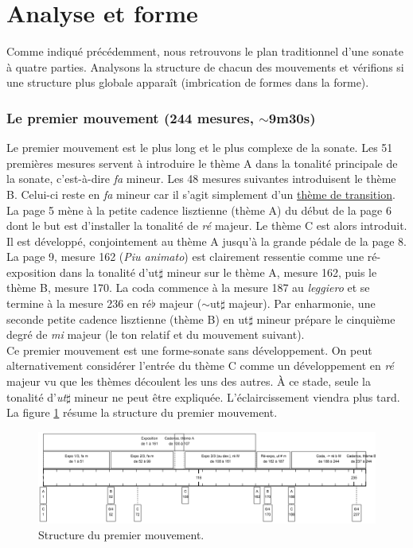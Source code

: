 \section{Analyse et forme}

Comme indiqué précédemment, nous retrouvons le plan traditionnel d'une sonate à quatre parties. Analysons la structure de chacun des mouvements et vérifions si une structure plus globale apparaît (imbrication de formes dans la forme).

\subsubsection*{Le premier mouvement (244 mesures, $\sim$9m30s)}

Le premier mouvement est le plus long et le plus complexe de la sonate. Les 51 premières mesures servent à introduire le thème A dans la tonalité principale de la sonate, c'est-à-dire \emph{fa} mineur. Les 48 mesures suivantes introduisent le thème B. Celui-ci reste en \emph{fa} mineur car il s'agit simplement d'un \underline{thème de transition}. La page 5 mène à la petite cadence lisztienne (thème A) du début de la page 6 dont le but est d'installer la tonalité de \emph{ré} majeur. Le thème C est alors introduit. Il est développé, conjointement au thème A jusqu'à la grande pédale de la page 8. La page 9, mesure 162 (\emph{Piu animato}) est clairement ressentie comme une ré-exposition dans la tonalité d'ut$\sharp$ mineur sur le thème A, mesure 162, puis le thème B, mesure 170. La coda commence à la mesure 187 au \emph{leggiero} et se termine à la mesure 236 en ré$\flat$ majeur ($\sim$ut$\sharp$ majeur). Par enharmonie, une seconde petite cadence lisztienne (thème B) en ut$\sharp$ mineur prépare le cinquième degré de \emph{mi} majeur (le ton relatif et du mouvement suivant).\\

Ce premier mouvement est une forme-sonate sans développement. On peut alternativement considérer l'entrée du thème C comme un développement en \emph{ré} majeur vu que les thèmes découlent les uns des autres. À ce stade, seule la tonalité d'\emph{ut}$\sharp$ mineur ne peut être expliquée. L'éclaircissement viendra plus tard. La figure \ref{schema-1} résume la structure du premier mouvement.

\begin{figure}[!ht]
  \begin{bigcenter}
    \includegraphics[width=17.5cm, keepaspectratio]{frise-mvt1.png}
  \end{bigcenter}
  \caption{\label{schema-1}Structure du premier mouvement.}
\end{figure}

